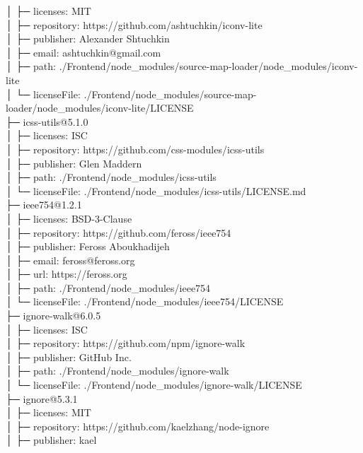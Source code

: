 \documentclass[
    paper=a4,
    twoside=false,
    parskip=half,
    listof=entryprefix,
    listof=totoc,
    index=totoc,
    bibliography=totoc,
    headsepline,
]{scrbook}
\begin{document}
    │  ├─ licenses: MIT\\
    │  ├─ repository: https://github.com/ashtuchkin/iconv-lite\\
    │  ├─ publisher: Alexander Shtuchkin\\
    │  ├─ email: ashtuchkin@gmail.com\\
    │  ├─ path: ./Frontend/node\_modules/source-map-loader/node\_modules/iconv-lite\\
    │  └─ licenseFile: ./Frontend/node\_modules/source-map-loader/node\_modules/iconv-lite/LICENSE\\
    ├─ icss-utils@5.1.0\\
    │  ├─ licenses: ISC\\
    │  ├─ repository: https://github.com/css-modules/icss-utils\\
    │  ├─ publisher: Glen Maddern\\
    │  ├─ path: ./Frontend/node\_modules/icss-utils\\
    │  └─ licenseFile: ./Frontend/node\_modules/icss-utils/LICENSE.md\\
    ├─ ieee754@1.2.1\\
    │  ├─ licenses: BSD-3-Clause\\
    │  ├─ repository: https://github.com/feross/ieee754\\
    │  ├─ publisher: Feross Aboukhadijeh\\
    │  ├─ email: feross@feross.org\\
    │  ├─ url: https://feross.org\\
    │  ├─ path: ./Frontend/node\_modules/ieee754\\
    │  └─ licenseFile: ./Frontend/node\_modules/ieee754/LICENSE\\
    ├─ ignore-walk@6.0.5\\
    │  ├─ licenses: ISC\\
    │  ├─ repository: https://github.com/npm/ignore-walk\\
    │  ├─ publisher: GitHub Inc.\\
    │  ├─ path: ./Frontend/node\_modules/ignore-walk\\
    │  └─ licenseFile: ./Frontend/node\_modules/ignore-walk/LICENSE\\
    ├─ ignore@5.3.1\\
    │  ├─ licenses: MIT\\
    │  ├─ repository: https://github.com/kaelzhang/node-ignore\\
    │  ├─ publisher: kael\\
\end{document}
